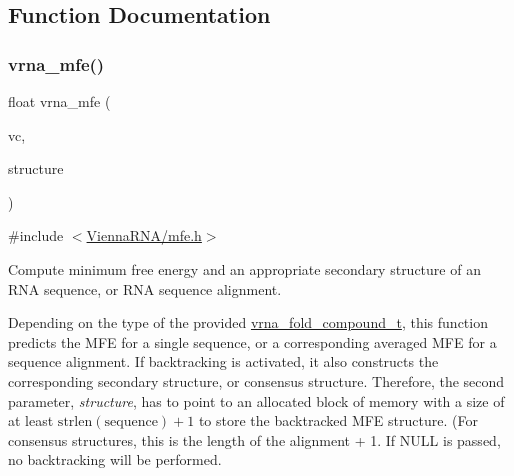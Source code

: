 \subsection{Function Documentation}
\mbox{\label{group__mfe__fold_gabd3b147371ccf25c577f88bbbaf159fd}} 
\subsubsection{\texorpdfstring{vrna\+\_\+mfe()}{vrna\_mfe()}}
{\footnotesize\ttfamily float vrna\+\_\+mfe (\begin{DoxyParamCaption}\item[{\mbox{\hyperlink{group__fold__compound_ga1b0cef17fd40466cef5968eaeeff6166}{vrna\+\_\+fold\+\_\+compound\+\_\+t}} $\ast$}]{vc,  }\item[{char $\ast$}]{structure }\end{DoxyParamCaption})}



{\ttfamily \#include $<$\mbox{\hyperlink{mfe_8h}{Vienna\+R\+N\+A/mfe.\+h}}$>$}



Compute minimum free energy and an appropriate secondary structure of an R\+NA sequence, or R\+NA sequence alignment. 

Depending on the type of the provided \mbox{\hyperlink{group__fold__compound_ga1b0cef17fd40466cef5968eaeeff6166}{vrna\+\_\+fold\+\_\+compound\+\_\+t}}, this function predicts the M\+FE for a single sequence, or a corresponding averaged M\+FE for a sequence alignment. If backtracking is activated, it also constructs the corresponding secondary structure, or consensus structure. Therefore, the second parameter, {\itshape structure}, has to point to an allocated block of memory with a size of at least $\mathrm{strlen}(\mathrm{sequence})+1$ to store the backtracked M\+FE structure. (For consensus structures, this is the length of the alignment + 1. If {\ttfamily N\+U\+LL} is passed, no backtracking will be performed.

